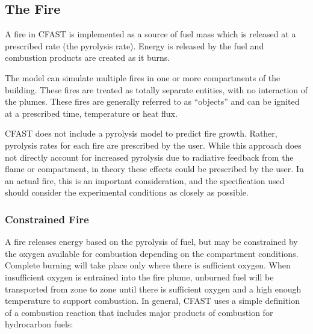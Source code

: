 \subsection{The Fire}

A fire in CFAST is implemented as a source of fuel mass which is released at a prescribed rate
(the pyrolysis rate). Energy is released by the fuel and combustion products are created as it
burns.

The model can simulate multiple fires in one or more compartments of the building. These fires
are treated as totally separate entities, with no interaction of the plumes. These fires are generally
referred to as ``objects'' and can be ignited at a prescribed time, temperature or heat flux.

CFAST does not include a pyrolysis model to predict fire growth. Rather, pyrolysis rates for
each fire are prescribed by the user. While this approach does not directly account for increased
pyrolysis due to radiative feedback from the flame or compartment, in theory these effects could
be prescribed by the user. In an actual fire, this is an important consideration, and the
specification used should consider the experimental conditions as closely as possible.

\subsubsection{Constrained Fire}

A fire releases energy based on the pyrolysis of fuel, but may be constrained by the oxygen
available for combustion depending on the compartment conditions. Complete burning will take
place only where there is sufficient oxygen. When insufficient oxygen is entrained into the fire
plume, unburned fuel will be transported from zone to zone until there is sufficient oxygen and a
high enough temperature to support combustion. In general, CFAST uses a simple definition of
a combustion reaction that includes major products of combustion for hydrocarbon fuels: